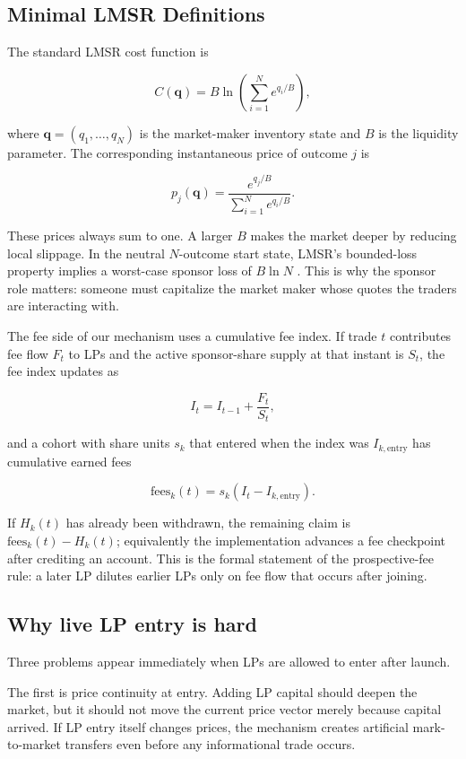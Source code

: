 \documentclass[10pt]{article}
\begin{document}
\subsection{Minimal LMSR Definitions}

The standard LMSR cost function is

\[
C(\mathbf{q}) = B \ln \left(\sum_{i=1}^{N} e^{q_i / B}\right),
\]

where $\mathbf{q} = (q_1,\dots,q_N)$ is the market-maker inventory state and $B$ is the liquidity parameter. The corresponding instantaneous price of outcome $j$ is

\[
p_j(\mathbf{q}) = \frac{e^{q_j / B}}{\sum_{i=1}^{N} e^{q_i / B}}.
\]

These prices always sum to one. A larger $B$ makes the market deeper by reducing local slippage. In the neutral $N$-outcome start state, LMSR's bounded-loss property implies a worst-case sponsor loss of $B \ln N$ \cite{hanson2002,chenpennock2007}. This is why the sponsor role matters: someone must capitalize the market maker whose quotes the traders are interacting with.

The fee side of our mechanism uses a cumulative fee index. If trade $t$ contributes fee flow $F_t$ to LPs and the active sponsor-share supply at that instant is $S_t$, the fee index updates as

\[
I_t = I_{t-1} + \frac{F_t}{S_t},
\]

and a cohort with share units $s_k$ that entered when the index was $I_{k,\mathrm{entry}}$ has cumulative earned fees

\[
\mathrm{fees}_k(t) = s_k \left(I_t - I_{k,\mathrm{entry}}\right).
\]

If $H_k(t)$ has already been withdrawn, the remaining claim is $\mathrm{fees}_k(t)-H_k(t)$; equivalently the implementation advances a fee checkpoint after crediting an account. This is the formal statement of the prospective-fee rule: a later LP dilutes earlier LPs only on fee flow that occurs after joining.

\subsection{Why live LP entry is hard}

Three problems appear immediately when LPs are allowed to enter after launch.

The first is price continuity at entry. Adding LP capital should deepen the market, but it should not move the current price vector merely because capital arrived. If LP entry itself changes prices, the mechanism creates artificial mark-to-market transfers even before any informational trade occurs.
\end{document}
